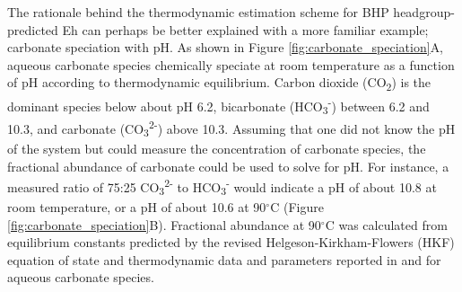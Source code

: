 The rationale behind the thermodynamic estimation scheme for BHP headgroup-predicted Eh can perhaps be better explained with a more familiar example; carbonate speciation with pH. As shown in Figure \ref{fig:carbonate_speciation}A, aqueous carbonate species chemically speciate at room temperature as a function of pH according to thermodynamic equilibrium. Carbon dioxide (CO\textsubscript{2}) is the dominant species below about pH 6.2, bicarbonate (HCO\textsubscript{3}\textsuperscript{-}) between 6.2 and 10.3, and carbonate (CO\textsubscript{3}\textsuperscript{2-}) above 10.3. Assuming that one did not know the pH of the system but could measure the concentration of carbonate species, the fractional abundance of carbonate could be used to solve for pH. For instance, a measured ratio of 75:25 CO\textsubscript{3}\textsuperscript{2-} to HCO\textsubscript{3}\textsuperscript{-} would indicate a pH of about 10.8 at room temperature, or a pH of about 10.6 at 90$^{\circ}$C (Figure \ref{fig:carbonate_speciation}B). Fractional abundance at 90$^{\circ}$C was calculated from equilibrium constants predicted by the revised Helgeson-Kirkham-Flowers (HKF) equation of state \citep{shock1992calculation} and thermodynamic data and parameters reported in \cite{shock1988calculation} and \cite{plyasunov2001correlation} for aqueous carbonate species.

